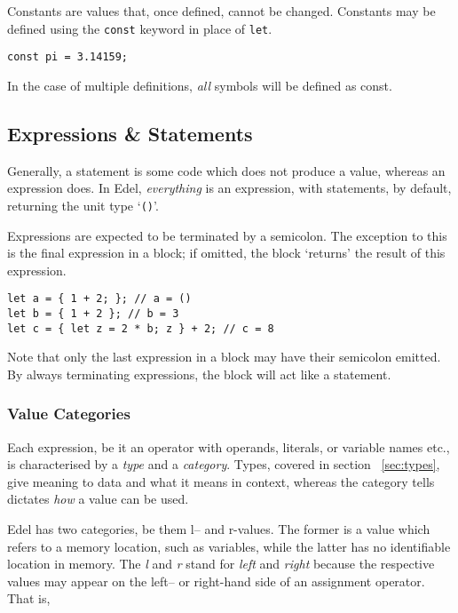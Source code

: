 \documentclass{article}
\begin{document}
    Constants are values that, once defined, cannot be changed.
    Constants may be defined using the \texttt{const} keyword in place of \texttt{let}.

    \begin{lstlisting}[language=CustomLang]
const pi = 3.14159;
    \end{lstlisting}

    In the case of multiple definitions, \textit{all} symbols will be defined as const.

    \subsection{Expressions \& Statements}\label{subsec:expressions-&-statements}

    Generally, a statement is some code which does not produce a value, whereas an expression does.
    In Edel, \textit{everything} is an expression, with statements, by default, returning the unit type `\texttt{()}'.

    Expressions are expected to be terminated by a semicolon.
    The exception to this is the final expression in a block; if omitted, the block `returns' the result of this expression.

    \begin{lstlisting}[language=CustomLang]
let a = { 1 + 2; }; // a = ()
let b = { 1 + 2 }; // b = 3
let c = { let z = 2 * b; z } + 2; // c = 8
    \end{lstlisting}

    Note that only the last expression in a block may have their semicolon emitted.
    By always terminating expressions, the block will act like a statement.

    \subsubsection{Value Categories}

    Each expression, be it an operator with operands, literals, or variable names etc., is characterised by a \textit{type} and a \textit{category}.
    Types, covered in section ~\ref{sec:types}, give meaning to data and what it means in context, whereas the category tells dictates \textit{how} a value can be used.

    Edel has two categories, be them l-- and r-values.
    The former is a value which refers to a memory location, such as variables, while the latter has no identifiable location in memory.
    The \textit{l} and \textit{r} stand for \textit{left} and \textit{right} because the respective values may appear on the left-- or right-hand side of an assignment operator.
    That is,
\end{document}
